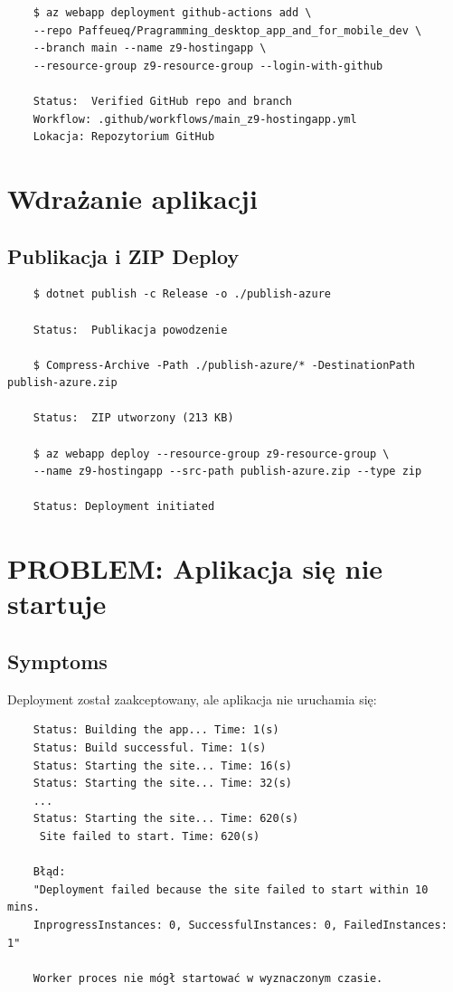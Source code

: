 \documentclass[twoside]{article}
\begin{document}
\begin{verbatim}
	$ az webapp deployment github-actions add \
	--repo Paffeueq/Pragramming_desktop_app_and_for_mobile_dev \
	--branch main --name z9-hostingapp \
	--resource-group z9-resource-group --login-with-github
	
	Status:  Verified GitHub repo and branch
	Workflow: .github/workflows/main_z9-hostingapp.yml
	Lokacja: Repozytorium GitHub
\end{verbatim}

\section{Wdrażanie aplikacji}

\subsection{Publikacja i ZIP Deploy}

\begin{verbatim}
	$ dotnet publish -c Release -o ./publish-azure
	
	Status:  Publikacja powodzenie
	
	$ Compress-Archive -Path ./publish-azure/* -DestinationPath publish-azure.zip
	
	Status:  ZIP utworzony (213 KB)
	
	$ az webapp deploy --resource-group z9-resource-group \
	--name z9-hostingapp --src-path publish-azure.zip --type zip
	
	Status: Deployment initiated
\end{verbatim}

\section{PROBLEM: Aplikacja się nie startuje}

\subsection{Symptoms}

Deployment został zaakceptowany, ale aplikacja nie uruchamia się:

\begin{verbatim}
	Status: Building the app... Time: 1(s)       
	Status: Build successful. Time: 1(s)          
	Status: Starting the site... Time: 16(s)
	Status: Starting the site... Time: 32(s)
	...
	Status: Starting the site... Time: 620(s)
	 Site failed to start. Time: 620(s)
	
	Błąd:
	"Deployment failed because the site failed to start within 10 mins.
	InprogressInstances: 0, SuccessfulInstances: 0, FailedInstances: 1"
	
	Worker proces nie mógł startować w wyznaczonym czasie.
\end{verbatim}
\end{document}

